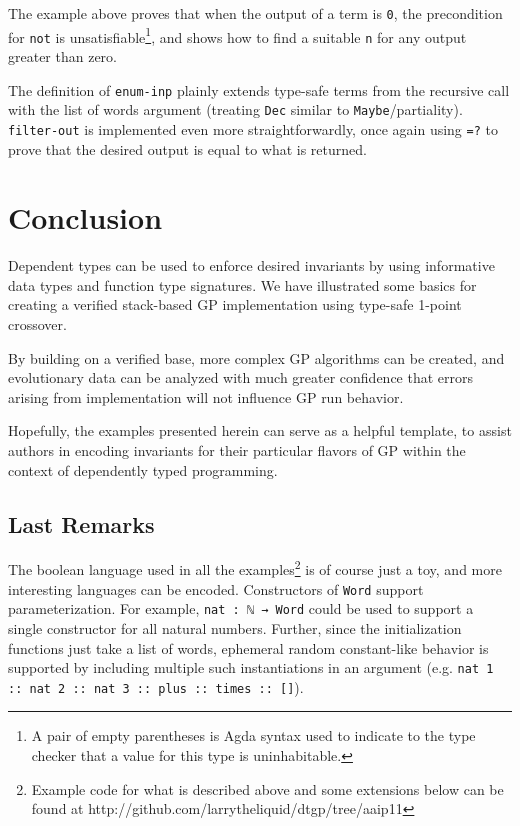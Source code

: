 \documentclass[runningheads,a4paper]{llncs}
\begin{document}
The example above proves that when the output of a term is \texttt{0},
the precondition for \texttt{not} is unsatisfiable\footnote{A pair of empty
  parentheses is Agda syntax used to indicate to the type
  checker that a value for this type is uninhabitable.}, and shows how
to find a suitable \texttt{n} for any output greater than zero.

The definition of \texttt{enum-inp} plainly extends type-safe terms
from the recursive call with the list of words argument (treating
\texttt{Dec} similar to
\texttt{Maybe}/partiality). \texttt{filter-out} is implemented even
more straightforwardly, once again using \texttt{=?} to prove that the
desired output is equal to what is returned.

\section{Conclusion}

Dependent types can be used to enforce desired invariants by using
informative data types and function type signatures. We have illustrated
some basics for creating a verified stack-based GP implementation
using type-safe 1-point crossover.

By building on a verified base, more complex GP algorithms can be
created, and evolutionary data can be analyzed with much greater
confidence that errors arising from implementation will not influence
GP run behavior.

Hopefully, the examples presented herein can serve as a helpful template,
to assist authors in encoding invariants for their particular flavors of
GP within the context of dependently typed programming.

\subsection{Last Remarks}

The boolean language used in all the examples\footnote{Example code
  for what is described above and some extensions below can
  be found at http://github.com/larrytheliquid/dtgp/tree/aaip11
} is of course just a toy,
and more interesting languages can be encoded. Constructors of
\texttt{Word} support parameterization. For example, \texttt{nat : ℕ →
  Word} could be used to support a single constructor for all natural
numbers. Further, since the initialization functions just take a list
of words, ephemeral random constant-like behavior is supported by
including multiple such instantiations in an argument
(e.g. \texttt{nat 1 :: nat 2 :: nat 3 :: plus :: times :: []}). 
\end{document}
